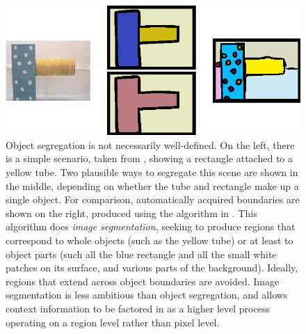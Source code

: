 \begin{figure}

\centerline{
\includegraphics[width=0.75\columnwidth]{fig-seg}}

\caption[Object segregation is not always well-defined]{
%
\ifcapped
%
Object segregation is not necessarily well-defined.
%
%
On the left,
there is a simple scenario, taken from ,
showing a rectangle attached to a yellow tube.  Two 
plausible ways to segregate this scene are shown in the middle,
depending on whether the tube and rectangle make up a single 
object.
%
For
comparison, automatically acquired boundaries are shown on the right,
produced using the algorithm in
. 
This algorithm does {\em image segmentation},
seeking to produce regions that correspond to whole objects (such as the
 yellow
tube) or at least to object parts (such all the blue rectangle and all
the small white patches on its surface, and various parts of the
background).  Ideally, regions that extend across object boundaries
are avoided.  Image segmentation is less ambitious than object segregation,
and allows context information to be factored in as a higher level
process operating on a region level rather than pixel level.
%
%
%
%
%
%
%
\fi
%
}

\label{fig:image-segmentation}

\end{figure}



%
%

